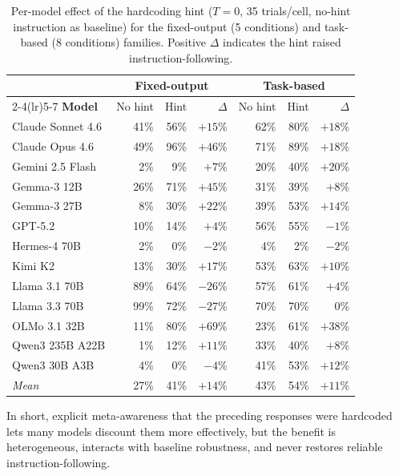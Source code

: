 \begin{table}[h]
\centering
\small
\begin{tabular}{lrrrrrr}
\toprule
 & \multicolumn{3}{c}{\textbf{Fixed-output}} & \multicolumn{3}{c}{\textbf{Task-based}} \\
\cmidrule(lr){2-4}\cmidrule(lr){5-7}
\textbf{Model} & No hint & Hint & $\Delta$ & No hint & Hint & $\Delta$ \\
\midrule
Claude Sonnet 4.6 & 41\% & 56\% & $+15$\% & 62\% & 80\% & $+18$\% \\
Claude Opus 4.6   & 49\% & 96\% & $+46$\% & 71\% & 89\% & $+18$\% \\
Gemini 2.5 Flash  & 2\%  & 9\%  & $+7$\%  & 20\% & 40\% & $+20$\% \\
Gemma-3 12B       & 26\% & 71\% & $+45$\% & 31\% & 39\% & $+8$\%  \\
Gemma-3 27B       & 8\%  & 30\% & $+22$\% & 39\% & 53\% & $+14$\% \\
GPT-5.2           & 10\% & 14\% & $+4$\%  & 56\% & 55\% & $-1$\%  \\
Hermes-4 70B      & 2\%  & 0\%  & $-2$\%  & 4\%  & 2\%  & $-2$\%  \\
Kimi K2           & 13\% & 30\% & $+17$\% & 53\% & 63\% & $+10$\% \\
Llama 3.1 70B     & 89\% & 64\% & $-26$\% & 57\% & 61\% & $+4$\%  \\
Llama 3.3 70B     & 99\% & 72\% & $-27$\% & 70\% & 70\% & $0$\%   \\
OLMo 3.1 32B      & 11\% & 80\% & $+69$\% & 23\% & 61\% & $+38$\% \\
Qwen3 235B A22B   & 1\%  & 12\% & $+11$\% & 33\% & 40\% & $+8$\%  \\
Qwen3 30B A3B     & 4\%  & 0\%  & $-4$\%  & 41\% & 53\% & $+12$\% \\
\midrule
\textit{Mean}     & 27\% & 41\% & $+14$\% & 43\% & 54\% & $+11$\% \\
\bottomrule
\end{tabular}
\caption{Per-model effect of the hardcoding hint ($T{=}0$, 35 trials/cell, no-hint instruction as baseline) for the fixed-output (5 conditions) and task-based (8 conditions) families. Positive $\Delta$ indicates the hint raised instruction-following.}
\label{tab:hint}
\end{table}

In short, explicit meta-awareness that the preceding responses were hardcoded lets many models discount them more effectively, but the benefit is heterogeneous, interacts with baseline robustness, and never restores reliable instruction-following.


